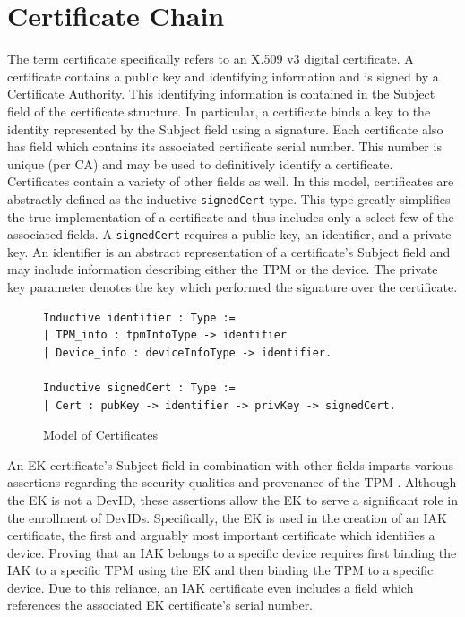 \section{Certificate Chain}

The term certificate specifically refers to an X.509 v3 digital certificate. 
A certificate contains a public key and identifying information and is signed by a Certificate Authority. This identifying information is contained in the Subject field of the certificate structure. 
In particular, a certificate binds a key to the identity represented by the Subject field using a signature.
Each certificate also has field which contains its associated certificate serial number. This number is unique (per CA) and may be used to definitively identify a certificate. 
Certificates contain a variety of other fields as well.
In this model, certificates are abstractly defined as the inductive \verb|signedCert| type. This type greatly simplifies the true implementation of a certificate and thus includes only a select few of the associated fields. A \verb|signedCert| requires a public key, an identifier, and a private key. An identifier is an abstract representation of a certificate's Subject field and may include information describing either the TPM or the device. The private key parameter denotes the key which performed the signature over the certificate.
\begin{figure}[h]
\begin{lstlisting}[language=Coq]
Inductive identifier : Type :=
| TPM_info : tpmInfoType -> identifier
| Device_info : deviceInfoType -> identifier.

Inductive signedCert : Type :=
| Cert : pubKey -> identifier -> privKey -> signedCert.
\end{lstlisting}
\caption{Model of Certificates}
\end{figure}

An EK certificate's Subject field in combination with other fields imparts various assertions regarding the security qualities and provenance of the TPM \cite{EKSpec}. 
Although the EK is not a DevID, these assertions allow the EK to serve a significant role in the enrollment of DevIDs.
Specifically, the EK is used in the creation of an IAK certificate, the first and arguably most important certificate which identifies a device.
Proving that an IAK belongs to a specific device requires first binding the IAK to a specific TPM using the EK and then binding the TPM to a specific device. Due to this reliance, an IAK certificate even includes a field which references the associated EK certificate's serial number.


